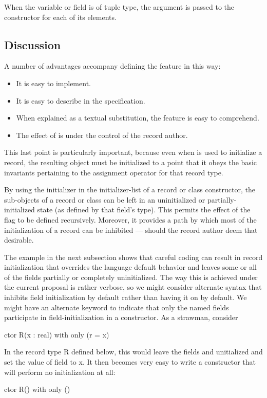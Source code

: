 When the variable or field is of tuple type, the
 argument is passed to the constructor for each of its elements.


\subsection{Discussion}
\label{noinit_Discussion}

A number of advantages accompany defining the  feature in this way:
\begin{itemize}
\item It is easy to implement.
\item It is easy to describe in the specification.
\item When explained as a textual substitution, the feature is easy to comprehend.
\item The effect of  is under the control of the record author.
\end{itemize}

This last point is particularly important, because even when  is used to
initialize a record, the resulting object must be initialized to a point that it obeys the
basic invariants pertaining to the assignment operator for that record type.

By using the  initializer in the initializer-list of a record or class
constructor, the sub-objects of a record or class can be left in an uninitialized or
partially-initialized state (as defined by that field's type).  This permits the effect of
the  flag to be defined recursively.  Moreover, it provides a path by which
most of the initialization of a record can be inhibited --- should the record author deem
that desirable.  

The example in the next subsection shows that careful coding can result in record
initialization that overrides the language default behavior and leaves some or all of the
fields partially or completely uninitialized.  The way this is achieved under the current
proposal is rather verbose, so we might consider alternate syntax that inhibits field
initialization by default rather than having it on by default.  We
might have an alternate keyword to indicate that only the named fields participate in
field-initialization in a constructor.  As a strawman, consider 
\begin{chapel}
ctor R(x : real)
with only (r = x)
{}
\end{chapel}
In the record type R defined below, this would leave the fields  and 
unitialized and set the value of field  to x.  It then becomes very easy to write
a constructor that will perform no initialization at all:
\begin{chapel}
ctor R() with only () {}
\end{chapel}

